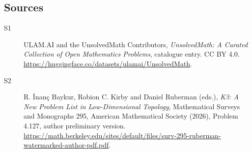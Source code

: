 \documentclass[11pt]{article}
\begin{document}
\subsection{Sources}
\begin{description}
\item[\hypertarget{source:statement:1}{S1}] ULAM.AI and the UnsolvedMath Contributors, \emph{UnsolvedMath: A Curated Collection of Open Mathematics Problems}, catalogue entry. CC BY 4.0. \url{https://huggingface.co/datasets/ulamai/UnsolvedMath}.
\item[\hypertarget{source:statement:2}{S2}] R. İnanç Baykur, Robion C. Kirby and Daniel Ruberman (eds.), \emph{K3: A New Problem List in Low-Dimensional Topology}, Mathematical Surveys and Monographs 295, American Mathematical Society (2026), Problem 4.127, author preliminary version. \url{https://math.berkeley.edu/sites/default/files/surv-295-ruberman-watermarked-author-pdf.pdf}.
\end{description}
\label{end:statement}
\end{document}
